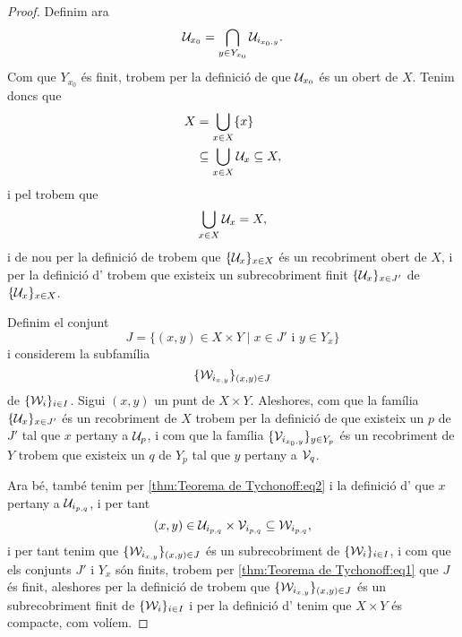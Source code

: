 \documentclass[../../Main.tex]{subfiles}
\begin{document}
\begin{theorem}
\begin{proof}
			Definim ara
			\begin{equation}
				\label{thm:Teorema de Tychonoff:eq2}
				\mathcal{U}_{x_{0}}=\bigcap_{y\in Y_{x_{0}}}\mathcal{U}_{i_{x_{0},y}}.
			\end{equation}
			Com que \(Y_{x_{0}}\) és finit, trobem per la definició de  que \(\mathcal{U}_{x_{0}}\) és un obert de \(X\). Tenim doncs que
			\begin{align*}
				X&=\bigcup_{x\in X}\{x\} \\
				&\subseteq\bigcup_{x\in X}\mathcal{U}_{x}\subseteq X,
			\end{align*}
			i pel  trobem que
			\[
			    \bigcup_{x\in X}\mathcal{U}_{x}=X,
			\]
			i de nou per la definició de  trobem que \(\{\mathcal{U}_{x}\}_{x\in X}\) és un recobriment obert de \(X\), i per la definició d' trobem que existeix un subrecobriment finit \(\{\mathcal{U}_{x}\}_{x\in J'}\) de \(\{\mathcal{U}_{x}\}_{x\in X}\).
			
			Definim el conjunt
			\begin{equation}
				\label{thm:Teorema de Tychonoff:eq1}
				J=\{(x,y)\in X\times Y\mid x\in J'\text{ i }y\in Y_{x}\}
			\end{equation}
			i considerem la subfamília
			\[
			    \{\mathcal{W}_{i_{x,y}}\}_{(x,y)\in J}
			\]
			de \(\{\mathcal{W}_{i}\}_{i\in I}\). Sigui \((x,y)\) un punt de \(X\times Y\). Aleshores, com que la família \(\{\mathcal{U}_{x}\}_{x\in J'}\) és un recobriment de \(X\) trobem per la definició de  que existeix un \(p\) de \(J'\) tal que \(x\) pertany a \(\mathcal{U}_{p}\), i com que la família \(\{\mathcal{V}_{i_{x_{0},y}}\}_{y\in Y_{p}}\) és un recobriment de \(Y\) trobem que existeix un \(q\) de \(Y_{p}\) tal que \(y\) pertany a \(\mathcal{V}_{q}\).
			
			Ara bé, també tenim per \eqref{thm:Teorema de Tychonoff:eq2} i la definició d' que \(x\) pertany a \(\mathcal{U}_{i_{p,q}}\), i per tant
			\[
			    (x,y)\in\mathcal{U}_{i_{p,q}}\times\mathcal{V}_{i_{p,q}}\subseteq\mathcal{W}_{i_{p,q}},
			\]
			i per tant tenim que \(\{\mathcal{W}_{i_{x,y}}\}_{(x,y)\in J}\) és un subrecobriment de \(\{\mathcal{W}_{i}\}_{i\in I}\), i com que els conjunts \(J'\) i \(Y_{x}\) són finits, trobem per \eqref{thm:Teorema de Tychonoff:eq1} que \(J\) és finit, aleshores per la definició de  trobem que \(\{\mathcal{W}_{i_{x,y}}\}_{(x,y)\in J}\) és un subrecobriment finit de \(\{\mathcal{W}_{i}\}_{i\in I}\) i per la definició d' tenim que \(X\times Y\) és compacte, com volíem.
		\end{proof}
	\end{theorem}
\end{document}
